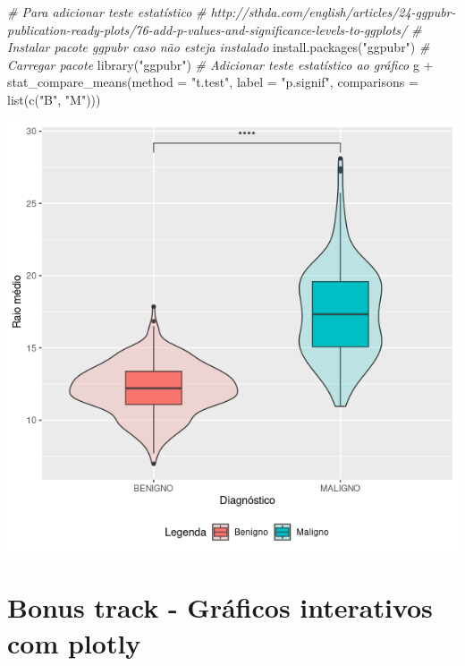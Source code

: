 \documentclass[
]{book}
\newenvironment{Shaded}{\begin{snugshade}}{\end{snugshade}}
\newcommand{\AttributeTok}[1]{\textcolor[rgb]{0.77,0.63,0.00}{#1}}
\newcommand{\CommentTok}[1]{\textcolor[rgb]{0.56,0.35,0.01}{\textit{#1}}}
\newcommand{\FunctionTok}[1]{\textcolor[rgb]{0.00,0.00,0.00}{#1}}
\newcommand{\NormalTok}[1]{#1}
\newcommand{\SpecialCharTok}[1]{\textcolor[rgb]{0.00,0.00,0.00}{#1}}
\newcommand{\StringTok}[1]{\textcolor[rgb]{0.31,0.60,0.02}{#1}}
\begin{document}
\begin{Shaded}
\begin{Highlighting}[]
\CommentTok{\# Para adicionar teste estatístico}
\CommentTok{\# http://sthda.com/english/articles/24{-}ggpubr{-}publication{-}ready{-}plots/76{-}add{-}p{-}values{-}and{-}significance{-}levels{-}to{-}ggplots/}
\CommentTok{\# Instalar pacote ggpubr caso não esteja instalado}
\FunctionTok{install.packages}\NormalTok{(}\StringTok{"ggpubr"}\NormalTok{)}
\CommentTok{\# Carregar pacote}
\FunctionTok{library}\NormalTok{(}\StringTok{"ggpubr"}\NormalTok{)}
\CommentTok{\# Adicionar teste estatístico ao gráfico}
\NormalTok{g }\SpecialCharTok{+}
\FunctionTok{stat\_compare\_means}\NormalTok{(}\AttributeTok{method =} \StringTok{"t.test"}\NormalTok{, }\AttributeTok{label =} \StringTok{"p.signif"}\NormalTok{,}
\AttributeTok{comparisons =} \FunctionTok{list}\NormalTok{(}\FunctionTok{c}\NormalTok{(}\StringTok{"B"}\NormalTok{, }\StringTok{"M"}\NormalTok{)))}
\end{Highlighting}
\end{Shaded}

\includegraphics{figure/g30.png}

\hypertarget{bonus-track---gruxe1ficos-interativos-com-plotly}{%
\section{Bonus track - Gráficos interativos com plotly}\label{bonus-track---gruxe1ficos-interativos-com-plotly}}
\end{document}
